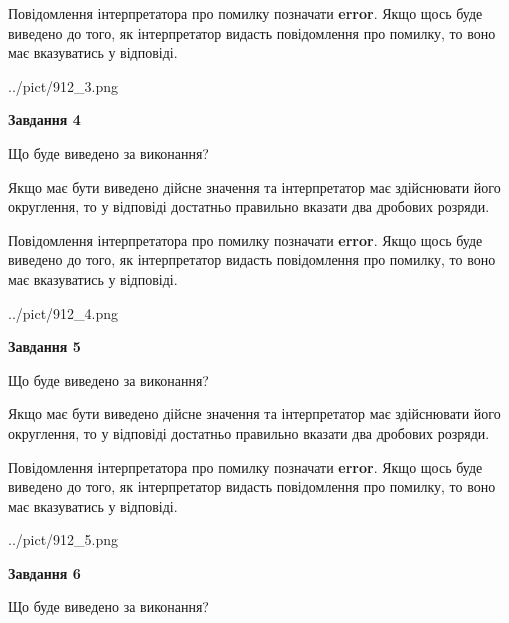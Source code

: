 \documentclass[12pt, ukrainian]{article}
\begin{document}
{\begin {Large}
Повідомлення інтерпретатора про помилку позначати \textbf{error}.
Якщо щось буде виведено до того, як інтерпретатор видасть повідомлення про помилку, 
то воно має вказуватись у відповіді. \par

\begin{center}
	{../pict/912_3.png}
\end{center}
\newpage

{\begin {center}\textbf{Завдання 4}\end {center}}\par
Що буде виведено за виконання? \par

Якщо має бути виведено дійсне значення та інтерпретатор має здійснювати його округлення, 
то у відповіді достатньо правильно вказати два дробових розряди.

Повідомлення інтерпретатора про помилку позначати \textbf{error}.
Якщо щось буде виведено до того, як інтерпретатор видасть повідомлення про помилку, 
то воно має вказуватись у відповіді. \par

\begin{center}
	{../pict/912_4.png}
\end{center}
\newpage

{\begin {center}\textbf{Завдання 5}\end {center}}\par
Що буде виведено за виконання? \par

Якщо має бути виведено дійсне значення та інтерпретатор має здійснювати його округлення, 
то у відповіді достатньо правильно вказати два дробових розряди.

Повідомлення інтерпретатора про помилку позначати \textbf{error}.
Якщо щось буде виведено до того, як інтерпретатор видасть повідомлення про помилку, 
то воно має вказуватись у відповіді. \par

\begin{center}
	{../pict/912_5.png}
\end{center}
\newpage

{\begin {center}\textbf{Завдання 6}\end {center}}\par
Що буде виведено за виконання? \par


\end{Large}}
\end{document}
